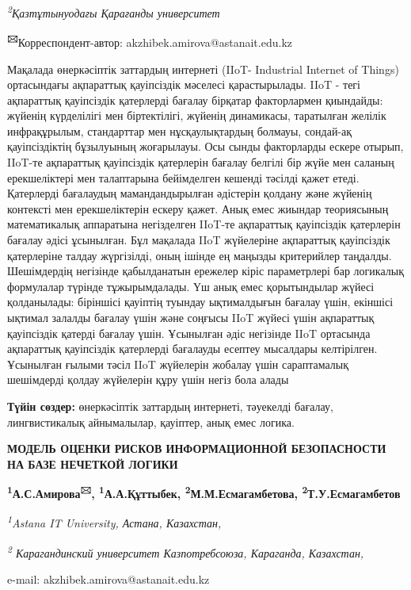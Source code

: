 \documentclass[
]{article}
\begin{document}
\emph{\textsuperscript{2}Қазтұтынуодағы Қарағанды университет}

\textbf{\textsuperscript{🖂}}Корреспондент-автор:
akzhibek.amirova@astanait.edu.kz

Мақалада өнеркәсіптік заттардың интернеті (IIoT- Industrial Internet of
Things) ортасындағы ақпараттық қауіпсіздік мәселесі қарастырылады. IIoT
- тегі ақпараттық қауіпсіздік қатерлерді бағалау бірқатар факторлармен
қиындайды: жүйенің күрделілігі мен біртектілігі, жүйенің динамикасы,
таратылған желілік инфрақұрылым, стандарттар мен нұсқаулықтардың
болмауы, сондай-ақ қауіпсіздіктің бұзылуының жоғарылауы. Осы сынды
факторларды ескере отырып, IIoT-те ақпараттық қауіпсіздік қатерлерін
бағалау белгілі бір жүйе мен саланың ерекшеліктері мен талаптарына
бейімделген кешенді тәсілді қажет етеді. Қатерлерді бағалаудың
мамандандырылған әдістерін қолдану және жүйенің контексті мен
ерекшеліктерін ескеру қажет. Анық емес жиындар теориясының математикалық
аппаратына негізделген IIoT-те ақпараттық қауіпсіздік қатерлерін бағалау
әдісі ұсынылған. Бұл мақалада IIoT жүйелеріне ақпараттық қауіпсіздік
қатерлеріне талдау жүргізілді, оның ішінде ең маңызды критерийлер
таңдалды. Шешімдердің негізінде қабылданатын ережелер кіріс параметрлері
бар логикалық формулалар түрінде тұжырымдалады. Үш анық емес
қорытындылар жүйесі қолданылады: біріншісі қауіптің туындау ықтималдығын
бағалау үшін, екіншісі ықтимал залалды бағалау үшін және соңғысы IIoT
жүйесі үшін ақпараттық қауіпсіздік қатерді бағалау үшін. Ұсынылған әдіс
негізінде IIoT ортасында ақпараттық қауіпсіздік қатерлерді бағалауды
есептеу мысалдары келтірілген. Ұсынылған ғылыми тәсіл IIoT жүйелерін
жобалау үшін сараптамалық шешімдерді қолдау жүйелерін құру үшін негіз
бола алады

\textbf{Түйін сөздер:} өнеркәсіптік заттардың интернеті, тәуекелді
бағалау, лингвистикалық айнымалылар, қауіптер, анық емес логика.

\textbf{МОДЕЛЬ ОЦЕНКИ РИСКОВ ИНФОРМАЦИОННОЙ БЕЗОПАСНОСТИ НА БАЗЕ
НЕЧЕТКОЙ ЛОГИКИ}

\textbf{\textsuperscript{1}А.С.Амирова\textsuperscript{🖂},
\textsuperscript{1}А.А.Құттыбек, \textsuperscript{2}М.М.Есмагамбетова,
\textsuperscript{2}Т.У.Есмагамбетов}

\emph{\textsuperscript{1}Astana IT University, Астана, Казахстан,}

\emph{\textsuperscript{2} Карагандинский университет Казпотребсоюза,
Караганда, Казахстан,}

e-mail: akzhibek.amirova@astanait.edu.kz
\end{document}
